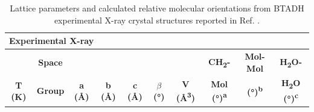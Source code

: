\begin{table}[ht]
  \centering
  \tiny
  \caption{Lattice parameters and calculated relative molecular orientations from BTADH experimental X-ray crystal structures reported in Ref. \citep{nichol_btadh_2005}.}
    \begin{tabular}{cccccccccc}
    \multicolumn{10}{l}{\textbf{Experimental X-ray}} \\
    \hline
    & \textbf{Space}  & & & & & & \textbf{CH\textsubscript{2}-} & \textbf{Mol-Mol} & \textbf{H\textsubscript{2}O-}\\
    \textbf{T (K)} & \textbf{Group} &	\textbf{a (Å)} & \textbf{b (Å)} & \textbf{c (Å)} & \textbf{\(\beta\)(°)} & \textbf{V (Å\textsuperscript{3})} & \textbf{Mol (°)\textsuperscript{a}} & \textbf{(°)\textsuperscript{b}} &	\textbf{H\textsubscript{2}O (°)\textsuperscript{c}} \\
    

\end{tabular}
\end{table}
